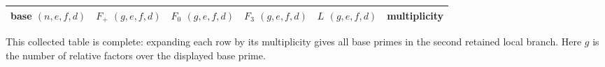\begingroup
\scriptsize
\setlength{\tabcolsep}{4.5pt}
\renewcommand{\arraystretch}{1.13}
\begin{tabular}{@{}cccccc@{}}
\toprule
base $(n,e,f,d)$ & $F_+$ $(g,e,f,d)$ & $F_0$ $(g,e,f,d)$ &
$F_3$ $(g,e,f,d)$ & $L$ $(g,e,f,d)$ & multiplicity \\
\midrule
%
\end{tabular}
\par\smallskip
\footnotesize This collected table is complete: expanding each row by its
multiplicity gives all base primes in the second retained local branch.  Here
$g$ is the number of relative factors over the displayed base prime.
\endgroup
